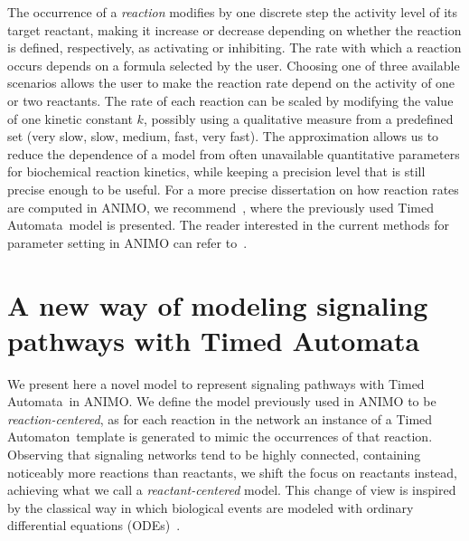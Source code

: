 \documentclass{llncs}
\newcommand{\ta}{Timed Automaton}
\newcommand{\tas}{Timed Automata}
\begin{document}
The occurrence of a \emph{reaction} modifies by one discrete step the activity level of its target reactant, making it increase or decrease 
depending on whether the reaction is defined, respectively, as activating or inhibiting.
The rate with which a reaction occurs depends on a formula selected by the user. 
Choosing one of three available scenarios allows the user to make the reaction rate depend on
the activity of one or two reactants.
The rate of each reaction can be scaled by modifying the value of one kinetic constant $k$,
possibly using a qualitative measure from a predefined set ({\sf very slow}, {\sf slow},
{\sf medium}, {\sf fast}, {\sf very fast}).
The approximation allows us to reduce the dependence of a model from often unavailable quantitative
parameters for biochemical reaction kinetics, while keeping a precision level that is still precise enough to be useful.
For a more precise dissertation on how reaction rates are computed in ANIMO, we recommend~\cite{animo-ieee},
where the previously used \tas\ model is presented. The reader interested in the current
methods for parameter setting in ANIMO can refer to~\cite{animo-syncop}.




\section{A new way of modeling signaling pathways with \tas}\label{sec:animo-new}
We present here a novel model to represent signaling pathways with \tas\ in ANIMO.
We define the model previously used in ANIMO to be \emph{reaction-centered}, as for each reaction
in the network an instance of a \ta\ template is generated to mimic
the occurrences of that reaction. Observing that signaling
networks tend to be highly connected, containing noticeably more reactions than reactants,
we shift the focus on reactants instead, achieving what we call a \emph{reactant-centered} model.
This change of view is inspired by the classical way in which biological events are modeled
with ordinary differential equations (ODEs)~\cite{ode-ma-anche-altro}.

\end{document}
